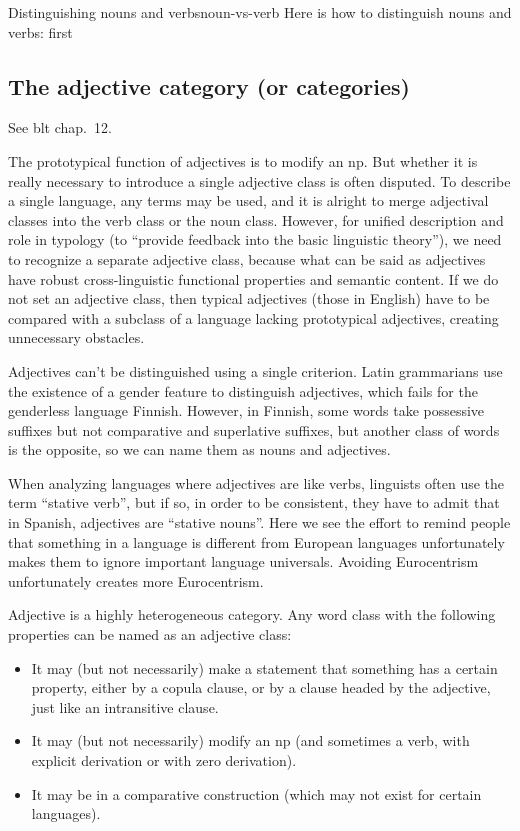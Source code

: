 \documentclass[UTF8, a4paper, oneside, scheme=plain]{ctexart}
\newcommand*{\citechap}[1]{chap.~{#1}}
\begin{document}
\begin{infobox}{Distinguishing nouns and verbs}{noun-vs-verb}
    Here is how to distinguish nouns and verbs:
    first 
\end{infobox}

\subsection{The adjective category (or categories)}

See \ac{blt} \citechap{12}. 

The prototypical function of adjectives is to modify an \ac{np}. 
But whether it is really necessary to introduce a single adjective class is often disputed. 
To describe a single language, any terms may be used, 
and it is alright to merge adjectival classes into the verb class or the noun class. 
However, for unified description and role in typology 
(to ``provide feedback into the basic linguistic theory''), 
we need to recognize a separate adjective class, 
because what can be said as adjectives have robust cross-linguistic functional properties and semantic content. 
If we do not set an adjective class, 
then typical adjectives (those in English) 
have to be compared with a subclass of a language lacking prototypical adjectives, 
creating unnecessary obstacles.

Adjectives can't be distinguished using a single criterion. 
Latin grammarians use the existence of a gender feature to distinguish adjectives, 
which fails for the genderless language Finnish. 
However, in Finnish, some words take possessive suffixes but not comparative and superlative suffixes, 
but another class of words is the opposite, so we can name them as nouns and adjectives.

When analyzing languages where adjectives are like verbs, 
linguists often use the term ``stative verb'', 
but if so, in order to be consistent, they have to admit that in Spanish, 
adjectives are ``stative nouns''. 
Here we see the effort to remind people that something in a language is different from European languages
unfortunately makes them to ignore important language universals.
Avoiding Eurocentrism unfortunately creates more Eurocentrism.

Adjective is a highly heterogeneous category. 
Any word class with the following properties can be named as an adjective class: 
\begin{itemize}
    \item It may (but not necessarily) make a statement that something has a certain property, 
    either by a copula clause,
    or by a clause headed by the adjective, 
    just like an intransitive clause.
    \item It may (but not necessarily) modify an \ac{np} 
    (and sometimes a verb, with explicit derivation or with zero derivation).
    \item It may be in a comparative construction (which may not exist for certain languages).
\end{itemize}
\end{document}
